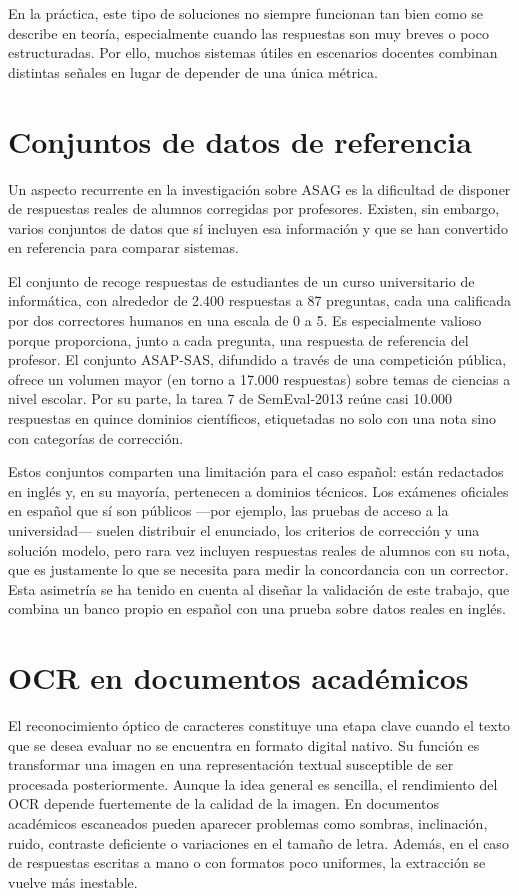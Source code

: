 En la práctica, este tipo de soluciones no siempre funcionan tan bien como se describe en teoría, especialmente cuando las respuestas son muy breves o poco estructuradas. Por ello, muchos sistemas útiles en escenarios docentes combinan distintas señales en lugar de depender de una única métrica.

\section{Conjuntos de datos de referencia}

Un aspecto recurrente en la investigación sobre ASAG es la dificultad de disponer de respuestas reales de alumnos corregidas por profesores. Existen, sin embargo, varios conjuntos de datos que sí incluyen esa información y que se han convertido en referencia para comparar sistemas.

El conjunto de \textcite{mohler2011} recoge respuestas de estudiantes de un curso universitario de informática, con alrededor de 2.400 respuestas a 87 preguntas, cada una calificada por dos correctores humanos en una escala de 0 a 5. Es especialmente valioso porque proporciona, junto a cada pregunta, una respuesta de referencia del profesor. El conjunto ASAP-SAS, difundido a través de una competición pública, ofrece un volumen mayor (en torno a 17.000 respuestas) sobre temas de ciencias a nivel escolar. Por su parte, la tarea 7 de SemEval-2013 \parencite{dzikovska2013} reúne casi 10.000 respuestas en quince dominios científicos, etiquetadas no solo con una nota sino con categorías de corrección.

Estos conjuntos comparten una limitación para el caso español: están redactados en inglés y, en su mayoría, pertenecen a dominios técnicos. Los exámenes oficiales en español que sí son públicos —por ejemplo, las pruebas de acceso a la universidad— suelen distribuir el enunciado, los criterios de corrección y una solución modelo, pero rara vez incluyen respuestas reales de alumnos con su nota, que es justamente lo que se necesita para medir la concordancia con un corrector. Esta asimetría se ha tenido en cuenta al diseñar la validación de este trabajo, que combina un banco propio en español con una prueba sobre datos reales en inglés.

\section{OCR en documentos académicos}

El reconocimiento óptico de caracteres constituye una etapa clave cuando el texto que se desea evaluar no se encuentra en formato digital nativo. Su función es transformar una imagen en una representación textual susceptible de ser procesada posteriormente. Aunque la idea general es sencilla, el rendimiento del OCR depende fuertemente de la calidad de la imagen. En documentos académicos escaneados pueden aparecer problemas como sombras, inclinación, ruido, contraste deficiente o variaciones en el tamaño de letra. Además, en el caso de respuestas escritas a mano o con formatos poco uniformes, la extracción se vuelve más inestable.

